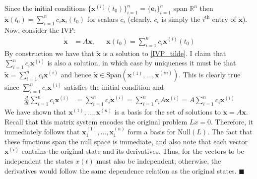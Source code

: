 \documentclass[12pt]{article}
\newcommand{\R}{\mathbb{R}}
\newcommand{\bx}{\mathbf{x}}
\newcommand{\be}{\mathbf{e}}
\begin{document}
 Since the initial conditions $\{\bx^{(i)}(t_0)\}_{i = 1}^{n} = \{\be_i\}_{i = 1}^{n}$ span $\R^n$ then $\tilde{\bx}(t_0) = \sum_{i = 1}^{n} c_i \bx_i(t_0)$ for scalars $c_i$ (clearly, $c_i$ is simply 
 the $i^{\text{th}}$ entry of $\tilde{\bx}$). Now, consider the IVP:
 \begin{align}
 \dot{\bx} &= A\bx, && \bx(t_0) = \sum_{i = 1}^{n} c_i \bx^{(i)}(t_0) \label{IVP_tilde}
 \end{align}
 By construction we have that $\tilde{\bx}$ is a solution to \ref{IVP_tilde}. I claim that $\sum_{i = 1}^{n} c_i \bx^{(i)}$ is also a solution, in which case by uniqueness it must be that 
 $\tilde{\bx} = \sum_{i = 1}^{n} c_i \bx^{(i)}$ and hence $\tilde{\bx} \in \text{Span}\left(\bx^{(1)}, \dots, \bx^{(in)} \right)$. This is clearly true since $\sum_{i = 1}^{n} c_i \bx^{(i)}$ satisfies the initial 
 condition and 
 \begin{align*}
 \frac{d}{dt} \sum_{i = 1}^{n} c_i \bx^{(i)} &= \sum_{i = 1}^{n} c_i \dot{\bx}^{(i)} = \sum_{i = 1}^{n} c_i A\bx^{(i)} = A \sum_{i = 1}^{n} c_i \bx^{(i)} 
 \end{align*}
 We have shown that $\bx^{(1)}, \dots, \bx^{(n)}$ is a basis for the set of solutions to $\dot{\bx} = A\bx$. Recall that this matrix system encodes the original problem $Lx = 0$. Therefore, it 
 immediately follows that $\bx^{(1)}_1, \dots, \bx^{(n)}_1$ form a basis for $\text{Null}(L)$. The fact that these functions span the null space is immediate, and also note that 
 each vector $\bx^{(i)}$ contains the original state and its derivatives. Thus, for the vectors to be independent the states $x(t)$ must also be independent; otherwise, the derivatives 
 would follow the same dependence relation as the original states. $\blacksquare$
\end{document}
